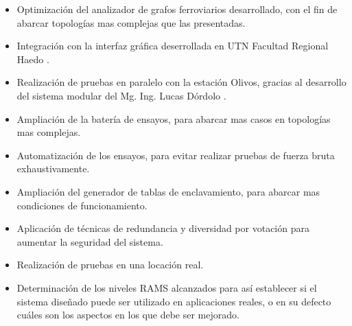 	\begin{itemize}
		\item Optimización del analizador de grafos ferroviarios desarrollado, con el fin de abarcar topologías mas complejas que las presentadas.
		\item Integración con la interfaz gráfica deserrollada en UTN Facultad Regional Haedo \cite{UTN}.
		\item Realización de pruebas en paralelo con la estación Olivos, gracias al desarrollo del sistema modular del Mg. Ing. Lucas Dórdolo \cite{Lucas}.
		\item Ampliación de la batería de ensayos, para abarcar mas casos en topologías mas complejas.
		\item Automatización de los ensayos, para evitar realizar pruebas de fuerza bruta exhaustivamente.
		\item Ampliación del generador de tablas de enclavamiento, para abarcar mas condiciones de funcionamiento.
		\item Aplicación de técnicas de redundancia y diversidad por votación para aumentar la seguridad del sistema.
		\item Realización de pruebas en una locación real.
		\item Determinación de los niveles RAMS alcanzados para así establecer si el sistema diseñado puede ser utilizado en aplicaciones reales, o en su defecto cuáles son los aspectos en los que debe ser mejorado.
	\end{itemize}
